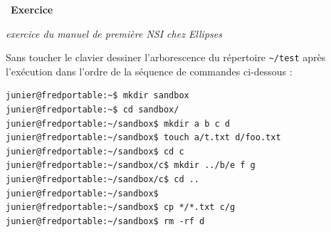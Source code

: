 \documentclass[
  11pt,
]{article}
\newcounter{exo}
\newenvironment{exercice}[1]
{\par \medskip   \addtocounter{exo}{1} \noindent  
\begin{bclogo}[arrondi =0.1,   noborder = true, logo=\bccrayon, marge=4]{~\textbf{Exercice} \textbf{\theexo} {\itshape #1} }  \par}
{
\end{bclogo}
 \par \bigskip }
\begin{document}
\begin{exercice}{}

\emph{exercice du manuel de première NSI chez Ellipses}

Sans toucher le clavier dessiner l'arborescence du répertoire
\texttt{\textasciitilde{}/test} après l'exécution dans l'ordre de la
séquence de commandes ci-dessous :

\begin{verbatim}
junier@fredportable:~$ mkdir sandbox
junier@fredportable:~$ cd sandbox/
junier@fredportable:~/sandbox$ mkdir a b c d
junier@fredportable:~/sandbox$ touch a/t.txt d/foo.txt
junier@fredportable:~/sandbox$ cd c
junier@fredportable:~/sandbox/c$ mkdir ../b/e f g
junier@fredportable:~/sandbox/c$ cd ..
junier@fredportable:~/sandbox$ 
junier@fredportable:~/sandbox$ cp */*.txt c/g
junier@fredportable:~/sandbox$ rm -rf d
\end{verbatim}

\end{exercice}
\end{document}
